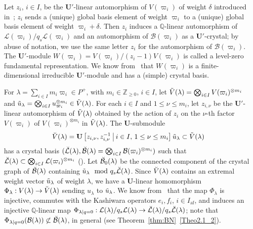 \documentclass[ALCO,ThmDefs,Unicode,epreuves]{cedram}
\newcommand{\BQ}{\mathbb{Q}}
\newcommand{\BZ}{\mathbb{Z}}
\renewcommand{\U}{\mathbf{U}}
\DeclareMathOperator{\af}{af}
\begin{document}
Let $z_i$, $i \in I$, be the $\U'$-linear automorphism of $V(\varpi_i)$ of weight $\delta$ introduced in~\cite[\S~5.2]{K02}; $z_i$ sends a (unique) global basis element of weight $\varpi_i$ to a (unique) global basis element of weight $\varpi_i+\delta$. 
Then $z_i$ induces a
$\BQ$-linear automorphism of 
$\mathcal{L}(\varpi_i) / q_s \mathcal{L}(\varpi_i)$
and an automorphism of 
$\mathcal{B}(\varpi_i)$ 
as a $\U'$-crystal; 
by abuse of notation, 
we use the same letter 
$z_i$ 
for the automorphism of 
$\mathcal{B}(\varpi_i)$. 
The $\U'$-module 
$W(\varpi_i) = V(\varpi_i) / (z_i - 1)V(\varpi_i)$
is called a level-zero fundamental representation. 
We know from~\cite[Theorem~5.17]{K02} that 
$W(\varpi_i)$ is a finite-dimensional irreducible $\U'$-module 
and has a (simple) crystal basis. 

For 
$\lambda = \sum_{i \in I} m_i \varpi_i \in P^+$, 
with 
$m_i \in \BZ_{\geq 0}$, $i \in I$, 
let 
$\Tilde{V}(\lambda) = \bigotimes_{i \in I} V(\varpi_i)^{\otimes m_i}$ 
and 
$\Tilde{u}_{\lambda} = \bigotimes_{i \in I} u_{\varpi_i}^{\otimes m_i} \in \Tilde{V}(\lambda)$. 
For each $i \in I$ and $1 \leq \nu \leq m_i$, let $z_{i,\nu}$ be the $\U'$-linear automorphism of $\Tilde{V}(\lambda)$ obtained by the action of $z_i$ on the $\nu$-th factor $V(\varpi_i)$ of $V(\varpi_i)^{\otimes m_i}$ in $\Tilde{V}(\lambda)$. The $\U$-submodule 
\begin{align}
\Breve{V}(\lambda) = \U \left[z_{i,\nu}, z_{i,\nu}^{-1} \ \vline \ i \in I , \, 1 \leq \nu \leq m_i \right] \Tilde{u}_{\lambda} \subset \Tilde{V}(\lambda)
\end{align}
has a crystal basis 
$(\Breve{\mathcal{L}}(\lambda) , \Breve{\mathcal{B}}(\lambda) = \bigotimes_{i \in I} \mathcal{B}(\varpi_i)^{\otimes m_i})$ 
such that 
$\Breve{\mathcal{L}}(\lambda) \subset \bigotimes_{i \in I} \mathcal{L}(\varpi_i)^{\otimes m_i}$
(\cite[Theorem~8.5]{K02}). 
Let
$\Breve{\mathcal{B}}_0(\lambda)$
be the connected component of the crystal graph of 
$\Breve{\mathcal{B}}(\lambda)$
containing 
$\Tilde{u}_{\lambda} \mod q_s \Breve{\mathcal{L}}(\lambda)$.
Since $\Breve{V}(\lambda)$ contains an extremal weight vector 
$\Tilde{u}_{\lambda}$ of weight $\lambda$, 
we have a $\U$-linear homomorphism
$\Phi_{\lambda} : V(\lambda) \rightarrow \Breve{V}(\lambda)$
sending $u_{\lambda}$ to $\Tilde{u}_{\lambda}$. 
We know from~\cite[\S~4.2]{BN04} that the map 
$\Phi_{\lambda}$ 
is injective, 
commutes with the Kashiwara operators 
$e_i , f_i$, $i \in I_{\af}$, 
and induces an injective $\BQ$-linear map
$\Phi_{\lambda \mid q=0} : \mathcal{L}(\lambda) / q_s \mathcal{L}(\lambda) \rightarrow \Breve{\mathcal{L}}(\lambda) / q_s \Breve{\mathcal{L}}(\lambda)$; 
note that 
$\Phi_{\lambda \mid q=0}(\mathcal{B}(\lambda)) \not\subset \Breve{\mathcal{B}}(\lambda)$, 
in general (see Theorem~\ref{thm:BN}~\ref{Theo2.1_2}).
\end{document}
